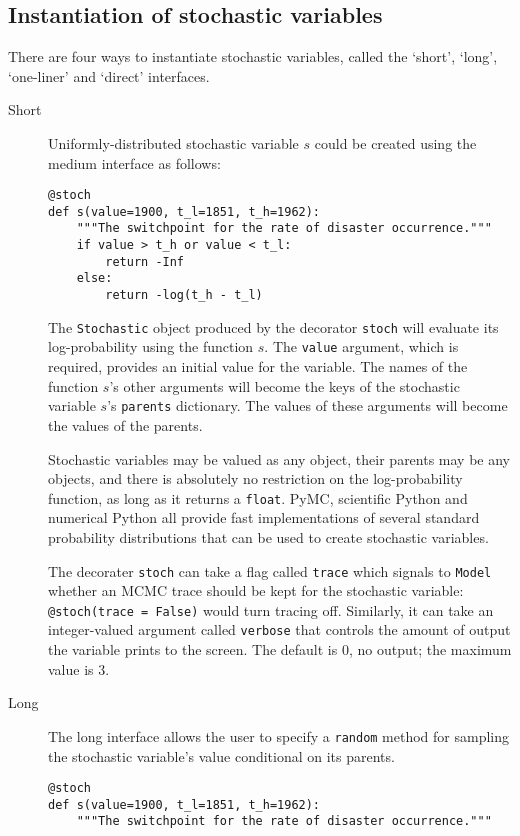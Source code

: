 \subsection{Instantiation of stochastic variables}
There are four ways to instantiate stochastic variables, called the `short', `long', `one-liner' and `direct' interfaces.
\begin{description}    
    \item[Short] Uniformly-distributed stochastic variable $s$ could be created using the medium interface as follows:
    \begin{verbatim}
@stoch
def s(value=1900, t_l=1851, t_h=1962):
    """The switchpoint for the rate of disaster occurrence."""
    if value > t_h or value < t_l:
        return -Inf
    else:
        return -log(t_h - t_l) 
    \end{verbatim}
    The \texttt{Stochastic} object produced by the decorator \texttt{stoch} will evaluate its log-probability using the function $s$. The \texttt{value} argument, which is required, provides an initial value for the variable. The names of the function $s$'s other arguments will become the keys of the stochastic variable $s$'s \texttt{parents} dictionary. The values of these arguments will become the values of the parents.

Stochastic variables may be valued as any object, their parents may be any objects, and there is absolutely no restriction on the log-probability function, as long as it returns a \texttt{float}. PyMC, scientific Python and numerical Python all provide fast implementations of several standard probability distributions that can be used to create stochastic variables.

    The decorater \texttt{stoch} can take a flag called \texttt{trace} which signals to \texttt{Model} whether an MCMC trace should be kept for the stochastic variable: \texttt{@stoch(trace = False)} would turn tracing off. Similarly, it can take an integer-valued argument called \texttt{verbose} that controls the amount of output the variable prints to the screen. The default is $0$, no output; the maximum value is 3.

    \item[Long] The long interface allows the user to specify a \texttt{random} method for sampling the stochastic variable's value conditional on its parents.
    \begin{verbatim}
@stoch
def s(value=1900, t_l=1851, t_h=1962):
    """The switchpoint for the rate of disaster occurrence."""


\end{verbatim}
\end{description}
